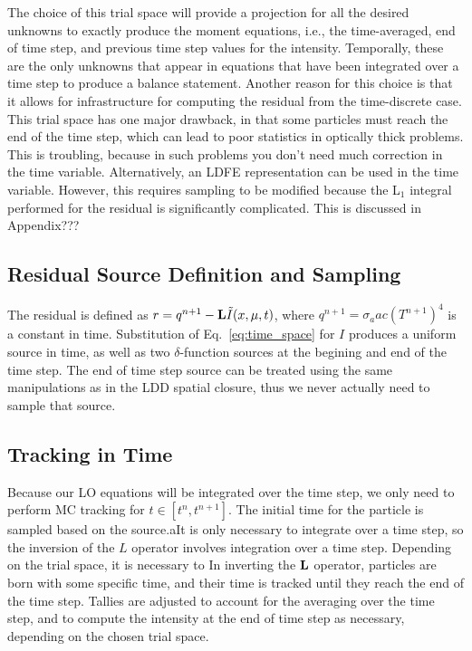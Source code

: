 The choice of this trial space will provide a projection for all the desired unknowns to exactly produce the moment
equations, i.e., the time-averaged, end of time step, and previous time step values for
the intensity.  Temporally, these are the only unknowns that appear in equations that have
been integrated over a time step to produce a balance statement.  Another reason for this
choice is that it allows for infrastructure for computing the residual from the
time-discrete case.  This trial space has one major drawback, in that some particles must
reach the end of the time step, which can lead to poor statistics in optically thick
problems.  This is troubling, because in such problems you don't need much correction in
the time variable.  Alternatively, an LDFE representation can be used in the time
variable.  However, this requires sampling to be modified because the L$_1$ integral
performed for the residual is significantly complicated.  This is discussed in Appendix???

\subsection{Residual Source Definition and Sampling}

The residual is defined as $r = q^{n+1} - \mathbf{L} \tilde I(x,\mu,t)$, where $q^{n+1}=\sigma_a a c
(T^{n+1})^4$ is a constant in time.  Substitution of Eq.~\eqref{eq:time_space} for $I$
produces a uniform source in time, as well as two $\delta$-function sources at the
begining and end of the time step.  The end of time step source can be treated using the
same manipulations as in the LDD spatial closure, thus we never actually need to sample
that source.



\subsection{Tracking in Time}

Because our LO equations will be integrated over the time step, we only need to
perform MC tracking for $t\in[t^{n},t^{n+1}]$.  The initial time for the particle is
sampled based on the source.aIt is only necessary to integrate over a time
step, so the inversion of the $L$ operator involves integration over a time step.
Depending on the trial space, it is necessary to 
  In inverting the $\mathbf{L}$ operator, particles are born with some specific
time, and their time is tracked until they reach the end of the time step.  Tallies are adjusted
to account for the averaging over the time step, and to compute the intensity at the end
of time step as necessary, depending on the chosen trial space.

